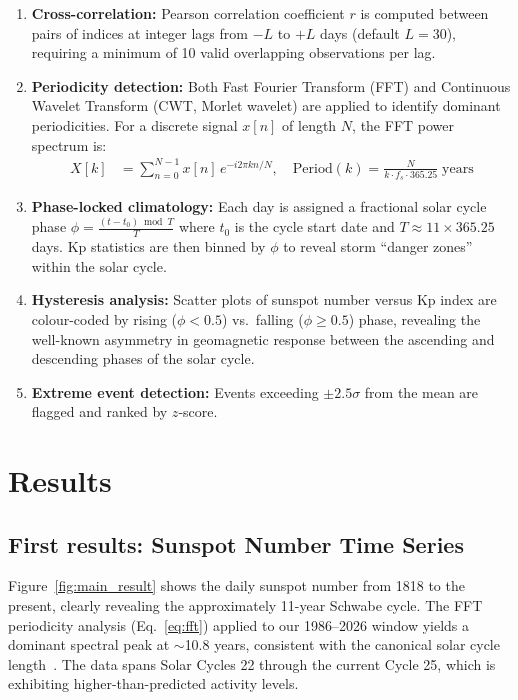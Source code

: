 \begin{enumerate}
    \item \textbf{Cross-correlation:} Pearson correlation coefficient $r$ is computed between pairs of indices at integer lags from $-L$ to $+L$ days (default $L = 30$), requiring a minimum of 10 valid overlapping observations per lag.
    \item \textbf{Periodicity detection:} Both Fast Fourier Transform (FFT) and Continuous Wavelet Transform (CWT, Morlet wavelet) are applied to identify dominant periodicities. For a discrete signal $x[n]$ of length $N$, the FFT power spectrum is:
    \begin{align}
        X[k] &= \sum_{n=0}^{N-1} x[n]\, e^{-i 2\pi k n / N}, \quad \text{Period}(k) = \frac{N}{k \cdot f_s \cdot 365.25} \; \text{years} \label{eq:fft}
    \end{align}
    \item \textbf{Phase-locked climatology:} Each day is assigned a fractional solar cycle phase $\phi = \frac{(t - t_0) \bmod T}{T}$ where $t_0$ is the cycle start date and $T \approx 11 \times 365.25$ days. Kp statistics are then binned by $\phi$ to reveal storm ``danger zones'' within the solar cycle.
    \item \textbf{Hysteresis analysis:} Scatter plots of sunspot number versus Kp index are colour-coded by rising ($\phi < 0.5$) vs.\ falling ($\phi \geq 0.5$) phase, revealing the well-known asymmetry in geomagnetic response between the ascending and descending phases of the solar cycle.
    \item \textbf{Extreme event detection:} Events exceeding $\pm 2.5\sigma$ from the mean are flagged and ranked by $z$-score.
\end{enumerate}


\section{Results}
\subsection{First results: Sunspot Number Time Series}

Figure~\ref{fig:main_result} shows the daily sunspot number from 1818 to the present, clearly revealing the approximately 11-year Schwabe cycle. The FFT periodicity analysis (Eq.~\ref{eq:fft}) applied to our 1986--2026 window yields a dominant spectral peak at $\sim$10.8 years, consistent with the canonical solar cycle length~\citep{hathaway_solar_2015}. The data spans Solar Cycles 22 through the current Cycle 25, which is exhibiting higher-than-predicted activity levels.

